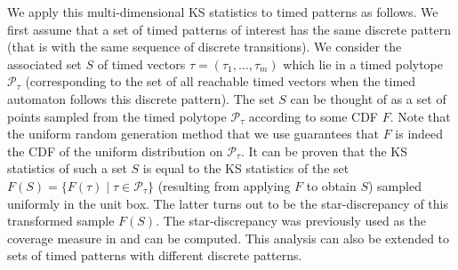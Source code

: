 
We apply this multi-dimensional KS statistics to timed patterns as follows. We first assume that a set of timed patterns of interest has the same discrete pattern (that is with the same sequence of discrete transitions). We consider the associated set $S$ of timed vectors $\tau = (\tau_1, \ldots, \tau_m)$ which lie in a timed polytope $\mathcal{P}_{\tau}$ (corresponding to the set of all reachable timed vectors when the timed automaton follows this discrete pattern). The set $S$ can be thought of as a set of points sampled from the timed polytope $\mathcal{P}_{\tau}$ according to some CDF $F$. Note that the uniform random generation method  \cite{BBBK16}  that we use guarantees that $F$ is indeed the CDF of the uniform distribution on $\mathcal{P}_{\tau}$. It can be proven that the KS statistics of such a set $S$ is equal to the KS statistics of the set $F(S)=\{F(\tau)\mid  \tau \in \mathcal{P}_{\tau}\}$ (resulting from applying $F$ to obtain $S$) sampled uniformly in the unit box. The latter turns out to be the star-discrepancy of this transformed sample $F(S)$. The star-discrepancy was previously used as the coverage measure in \cite{Dang10} and can be computed. This analysis can also be extended to sets of timed patterns with different discrete patterns.



